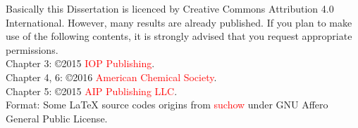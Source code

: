 
 {\small Basically this Dissertation is licenced by Creative Commons Attribution 4.0 International. However, many results are already published. If you plan to make use of the following contents, it is strongly advised that you request appropriate permissions.} \\
 Chapter 3: \copyright 2015 \textcolor{Red}{IOP Publishing}. \\
 Chapter 4, 6: \copyright 2016 \textcolor{Red}{American Chemical Society}. \\
 Chapter 5: \copyright 2015 \textcolor{Red}{AIP Publishing LLC}. \\
 Format: Some \LaTeX \xspace source codes origins from \textcolor{Red}{suchow} under GNU Affero General Public License. 
